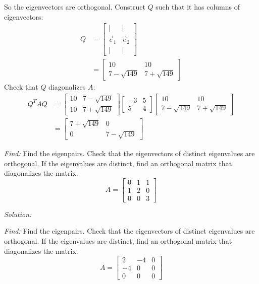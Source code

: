 \documentclass[11pt]{homework}
\begin{document}
So the eigenvectors are orthogonal.
Construct $Q$ such that it has
columns of eigenvectors:
\begin{align*}
Q &= 
  \begin{bmatrix}
  | & | \\
  \vec e_1 & \vec e_2 \\
  | & | 
  \end{bmatrix}\\
  &=
  \begin{bmatrix}
  10             & 10 \\
  7 - \sqrt{149} & 7 + \sqrt{149}
  \end{bmatrix}
\end{align*}
Check that $Q$ diagonalizes $A$:
\begin{align*}
Q^T A Q &=
  \begin{bmatrix}
  10 & 7 - \sqrt{149}\\
  10 & 7 + \sqrt{149}
  \end{bmatrix}
  \begin{bmatrix}
  -3 & 5 \\
  5 & 4
  \end{bmatrix}
  \begin{bmatrix}
  10             & 10 \\
  7 - \sqrt{149} & 7 + \sqrt{149}
  \end{bmatrix} \\
  &=
  \begin{bmatrix}
  7 + \sqrt{149} & 0 \\
  0 & 7 - \sqrt{149}
  \end{bmatrix}
\end{align*}

\question
\emph{Find:}
\newline
Find the eigenpairs.
Check that the eigenvectors of distinct eigenvalues are orthogonal.
If the eigenvalues are distinct, find an orthogonal matrix that diagonalizes the matrix.
\begin{equation*}
A = 
  \begin{bmatrix}
  0 & 1 & 1 \\
  1 & 2 & 0 \\
  0 & 0 & 3
  \end{bmatrix}
\end{equation*}

\emph{Solution:}
\newline


\question
\emph{Find:}
\newline
Find the eigenpairs.
Check that the eigenvectors of distinct eigenvalues are orthogonal.
If the eigenvalues are distinct, find an orthogonal matrix that diagonalizes the matrix.
\begin{equation*}
A = 
  \begin{bmatrix}
  2 & -4 & 0 \\
  -4 & 0 & 0 \\
  0 &  0 & 0
  \end{bmatrix}
\end{equation*}
\end{document}
